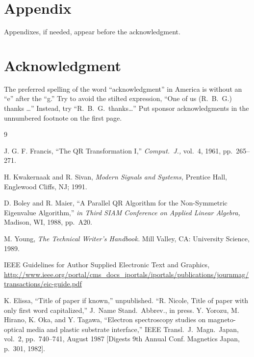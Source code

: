 \documentclass[conference]{IEEEtran}
\begin{document}
\section*{Appendix}
Appendixes, if needed, appear before the acknowledgment.



\section*{Acknowledgment}
The preferred spelling of the word ``acknowledgment'' in America is without an ``e'' after the ``g.''  Try to avoid the stilted expression, ``One of us (R.~B.~G.) thanks \dots'' Instead, try ``R.~B.~G.\ thanks\dots''  Put sponsor acknowledgments in the unnumbered footnote on the first page.

\begin{thebibliography}{9}

J. G. F. Francis, ``The QR Transformation I,'' {\it Comput.\ J.,} vol.~4, 1961, pp.~265--271.

H. Kwakernaak and R. Sivan, {\it Modern Signals and Systems,} Prentice Hall, Englewood Cliffs, NJ; 1991.

D. Boley and R. Maier, ``A Parallel QR Algorithm for the Non-Symmetric Eigenvalue Algorithm,'' {\it in Third SIAM Conference on Applied Linear Algebra,} Madison, WI, 1988, pp.~A20.


M. Young, {\it The Technical Writer's Handbook.} Mill Valley, CA:  University Science, 1989.

IEEE Guidelines for Author
Supplied Electronic
Text and Graphics, \url{http://www.ieee.org/portal/cms_docs_iportals/iportals/publications/journmag/transactions/eic-guide.pdf}


 K. Elissa, ``Title of paper if known,'' unpublished.
 ``R. Nicole, Title of paper with only first word capitalized,'' J.\ Name Stand.\ Abbrev., in press.
 Y. Yorozu, M. Hirano, K. Oka, and Y. Tagawa, ``Electron spectroscopy studies on magneto-optical media and plastic substrate interface,'' IEEE Transl.\ J.\ Magn.\ Japan, vol.~2, pp.~740--741, August 1987 [Digests 9th Annual Conf. Magnetics Japan, p.~301, 1982].


\end{thebibliography}
\end{document}
